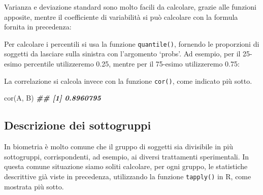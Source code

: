 \documentclass[
  12pt,
]{book}
\newenvironment{Shaded}{\begin{snugshade}}{\end{snugshade}}
\newcommand{\AttributeTok}[1]{\textcolor[rgb]{0.77,0.63,0.00}{#1}}
\newcommand{\DecValTok}[1]{\textcolor[rgb]{0.00,0.00,0.81}{#1}}
\newcommand{\DocumentationTok}[1]{\textcolor[rgb]{0.56,0.35,0.01}{\textbf{\textit{#1}}}}
\newcommand{\FloatTok}[1]{\textcolor[rgb]{0.00,0.00,0.81}{#1}}
\newcommand{\FunctionTok}[1]{\textcolor[rgb]{0.00,0.00,0.00}{#1}}
\newcommand{\NormalTok}[1]{#1}
\newcommand{\SpecialCharTok}[1]{\textcolor[rgb]{0.00,0.00,0.00}{#1}}
\begin{document}
Varianza e deviazione standard sono molto facili da calcolare, grazie alle funzioni apposite, mentre il coefficiente di variabilità si può calcolare con la formula fornita in precedenza:

\begin{Shaded}
\end{Shaded}

Per calcolare i percentili si usa la funzione \texttt{quantile()}, fornendo le proporzioni di soggetti da lasciare sulla sinistra con l'argomento `probs'. Ad esempio, per il 25-esimo percentile utilizzeremo 0.25, mentre per il 75-esimo utilizzeremo 0.75:

\begin{Shaded}
\end{Shaded}

La correlazione si calcola invece con la funzione \texttt{cor()}, come indicato più sotto.

\begin{Shaded}
\begin{Highlighting}[]
\FunctionTok{cor}\NormalTok{(A, B)}
\DocumentationTok{\#\# [1] 0.8960795}
\end{Highlighting}
\end{Shaded}

\hypertarget{descrizione-dei-sottogruppi}{%
\subsection{Descrizione dei sottogruppi}\label{descrizione-dei-sottogruppi}}

In biometria è molto comune che il gruppo di soggetti sia divisibile in più sottogruppi, corrispondenti, ad esempio, ai diversi trattamenti sperimentali. In questa comune situazione siamo soliti calcolare, per ogni gruppo, le statistiche descrittive già viste in precedenza, utilizzando la funzione \texttt{tapply()} in R, come mostrata più sotto.
\end{document}
